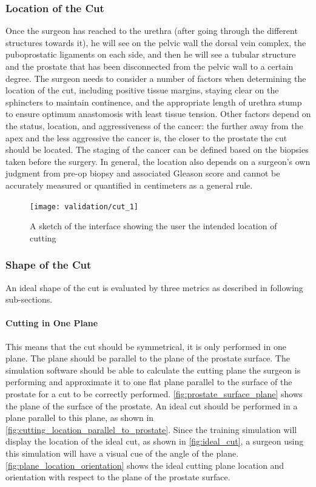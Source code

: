 \subsubsection{Location of the Cut}
Once the surgeon has reached to the urethra (after going through the different structures towards it), he will see on the pelvic wall the dorsal vein complex, the puboprostatic ligaments on each side, and then he will see a tubular structure and the prostate that has been disconnected from the pelvic wall to a certain degree. The surgeon needs to consider a number of factors when determining the location of the cut, including positive tissue margins, staying clear on the sphincters to maintain continence, and the appropriate length of urethra stump to ensure optimum anastomosis with least tissue tension. Other factors depend on the status, location, and aggressiveness of the cancer: the further away from the apex and the less aggressive the cancer is, the closer to the prostate the cut should be located. The staging of the cancer can be defined based on the biopsies taken before the surgery. In general, the location also depends on a surgeon's own judgment from pre-op biopsy and associated Gleason score and cannot be accurately measured or quantified in centimeters as a general rule.

\begin{figure}
  \centering%
  \texttt{[image: validation/cut\_1]}
  \caption{A sketch of the interface showing the user the intended location of cutting}
  \label{fig:ideal_cut}
\end{figure}

\subsubsection{Shape of the Cut}
An ideal shape of the cut is evaluated by three  metrics as described in following sub-sections.

\paragraph{Cutting in One Plane}
\label{par:metric_1}
This means that the cut should be symmetrical, \ie it is only performed in one plane. The plane should be parallel to the plane of the prostate surface. The simulation software should be able to calculate the cutting plane the surgeon is performing and approximate it to one flat plane parallel to the surface of the prostate for a cut to be correctly performed.
\autoref{fig:prostate_surface_plane} shows the plane of the surface of the prostate. An ideal cut should be performed in a plane parallel to this plane, as shown in \autoref{fig:cutting_location_parallel_to_prostate}. Since the training simulation will display the location of the ideal cut, as shown in \autoref{fig:ideal_cut}, a surgeon using this simulation will have a visual cue of the angle of the plane. \autoref{fig:plane_location_orientation} shows the ideal cutting plane location and orientation with respect to the plane of the prostate surface.

